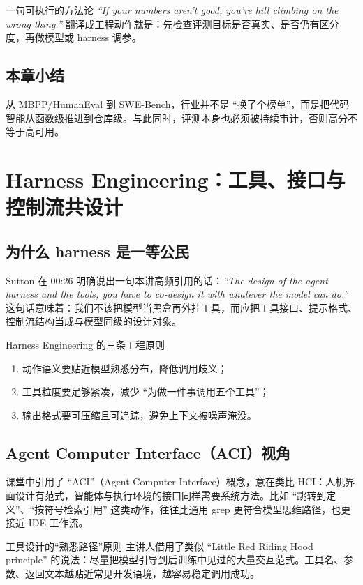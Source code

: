 \documentclass[a4paper]{article}
\begin{document}
\begin{importantbox}{一句可执行的方法论}
\textit{``If your numbers aren't good, you're hill climbing on the wrong thing.''}  
翻译成工程动作就是：先检查评测目标是否真实、是否仍有区分度，再做模型或 harness 调参。
\end{importantbox}

\subsection{本章小结}
从 MBPP/HumanEval 到 SWE-Bench，行业并不是 ``换了个榜单''，而是把代码智能从函数级推进到仓库级。与此同时，评测本身也必须被持续审计，否则高分不等于高可用。

\section{Harness Engineering：工具、接口与控制流共设计}

\subsection{为什么 harness 是一等公民}
Sutton 在 00:26 明确说出一句本讲高频引用的话：\textit{``The design of the agent harness and the tools, you have to co-design it with whatever the model can do.''}  
这句话意味着：我们不该把模型当黑盒再外挂工具，而应把工具接口、提示格式、控制流结构当成与模型同级的设计对象。

\begin{importantbox}{Harness Engineering 的三条工程原则}
\begin{enumerate}
    \item 动作语义要贴近模型熟悉分布，降低调用歧义；
    \item 工具粒度要足够紧凑，减少 ``为做一件事调用五个工具''；
    \item 输出格式要可压缩且可追踪，避免上下文被噪声淹没。
\end{enumerate}
\end{importantbox}

\subsection{Agent Computer Interface（ACI）视角}
课堂中引用了 ``ACI''（Agent Computer Interface）概念，意在类比 HCI：人机界面设计有范式，智能体与执行环境的接口同样需要系统方法。比如 ``跳转到定义''、``按符号检索引用'' 这类动作，往往比通用 grep 更符合模型思维路径，也更接近 IDE 工作流。

\begin{knowledgebox}{工具设计的“熟悉路径”原则}
主讲人借用了类似 ``Little Red Riding Hood principle'' 的说法：尽量把模型引导到后训练中见过的大量交互范式。工具名、参数、返回文本越贴近常见开发语境，越容易稳定调用成功。
\end{knowledgebox}
\end{document}
